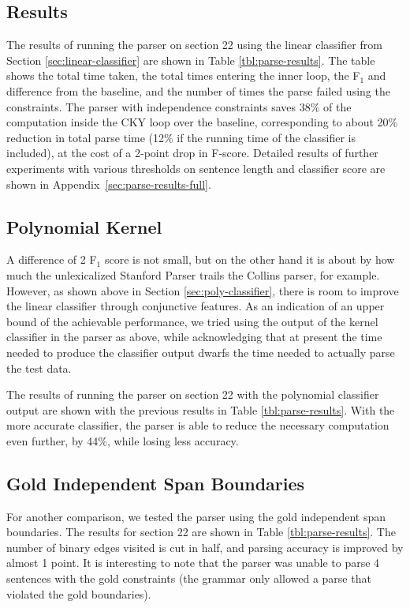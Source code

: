 \documentclass[11pt]{article}
\begin{document}
\subsection{Results}
\label{sec-5-2}
\label{sec:parse-results}

The results of running the parser on section 22 using the linear classifier from
Section \ref{sec:linear-classifier} are shown in Table \ref{tbl:parse-results}.
The table shows the total time taken, the total times entering the inner loop,
the F$_{\text{1}}$ and difference from the baseline, and the number of times the
parse failed using the constraints. The parser with independence constraints
saves 38\% of the computation inside the CKY loop over the baseline,
corresponding to about 20\% reduction in total parse time (12\% if the running
time of the classifier is included), at the cost of a 2-point drop in F-score.
Detailed results of further experiments with various thresholds on sentence
length and classifier score are shown in Appendix~\ref{sec:parse-results-full}.

\subsection{Polynomial Kernel}
\label{sec-5-3}

A difference of 2 F$_{\text{1}}$ score is not small, but on the other hand it is
about by how much the unlexicalized Stanford Parser trails the Collins
parser, for example. However, as shown above in Section
\ref{sec:poly-classifier}, there is room to improve the linear
classifier through conjunctive features. As an indication of an upper
bound of the achievable performance, we tried using the output of the
kernel classifier in the parser as above, while acknowledging that at
present the time needed to produce the classifier output dwarfs the
time needed to actually parse the test data.

The results of running the parser on section 22 with the polynomial classifier
output are shown with the previous results in Table \ref{tbl:parse-results}.
With the more accurate classifier, the parser is able to reduce the necessary
computation even further, by 44\%, while losing less accuracy. 

\subsection{Gold Independent Span Boundaries}
\label{sec-5-4}

For another comparison, we tested the parser using the gold independent span
boundaries. The results for section 22 are shown in Table
\ref{tbl:parse-results}. The number of binary edges visited is cut in half, and
parsing accuracy is improved by almost 1 point. It is interesting to note that the
parser was unable to parse 4 sentences with the gold constraints (the grammar
only allowed a parse that violated the gold boundaries).
\end{document}
